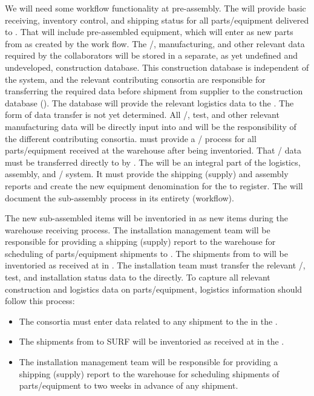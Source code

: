 We will need some workflow functionality at  pre-assembly.
The  will provide basic receiving, inventory control, and shipping status for all parts/equipment delivered to . That will include pre-assembled equipment, which will enter as new parts from  as created by the work flow.
The /, manufacturing, and other relevant data required by the  collaborators will be stored in a separate, as yet undefined and undeveloped,  construction database. 
This  construction database is independent of the  system, and the relevant contributing consortia are responsible for transferring the required data before shipment from supplier to the  construction database ().  The  database will provide the relevant logistics data to the . The form of data transfer is not yet determined.
All /, test, and other relevant manufacturing data will be directly input into  and will be the responsibility of the different contributing consortia.  must provide a / process for all parts/equipment received at the warehouse after being inventoried. That / data must be transferred directly to  by . 
The  will be an integral part of the logistics, assembly, and / system. It must provide the  shipping (supply) and assembly reports and create the new equipment denomination for the  to register.  The  will document the  sub-assembly process in its entirety (workflow).

The new sub-assembled items will be inventoried in  as new items during the warehouse receiving process.
The  installation management team will be responsible for providing a shipping (supply) report to the warehouse for scheduling of parts/equipment shipments to .
The shipments from  to  will be inventoried as received at  in .
The  installation team must transfer the relevant /, test, and installation status data to the  directly.
To capture all relevant construction and logistics data on parts/equipment, logistics information should follow this process:

\begin{itemize}
\item The consortia must enter data related to any shipment to the  in the .
\item The shipments from  to SURF will be inventoried as received at  in the .
\item The  installation management team will be responsible for providing a shipping (supply) report to the warehouse for scheduling shipments of parts/equipment to  two weeks in advance of any shipment.
\end{itemize}







